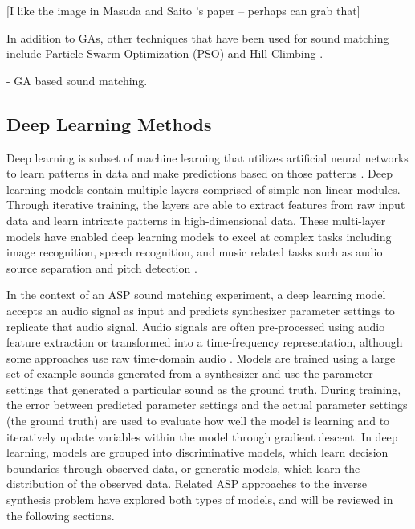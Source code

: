 [I like the image in Masuda and Saito 's paper -- perhaps can grab that]

In addition to GAs, other techniques that have been used for sound matching include Particle Swarm Optimization (PSO) \cite{heise2009automatic} and Hill-Climbing \cite{roth2011comparison, luke2019stochastic}.

\cite{masudo2021quality} - GA based sound matching.

\subsection{Deep Learning Methods}
Deep learning is subset of machine learning that utilizes artificial neural networks to learn patterns in data and make predictions based on those patterns \cite{lecun2015deep}. Deep learning models contain multiple layers comprised of simple non-linear modules. Through iterative training, the layers are able to extract features from raw input data and learn intricate patterns in high-dimensional data. These multi-layer models have enabled deep learning models to excel at complex tasks including image recognition, speech recognition, and music related tasks such as audio source separation \cite{spleeter2019} and pitch detection \cite{kim2018crepe}.

In the context of an ASP sound matching experiment, a deep learning model accepts an audio signal as input and predicts synthesizer parameter settings to replicate that audio signal. Audio signals are often pre-processed using audio feature extraction or transformed into a time-frequency representation, although some approaches use raw time-domain audio \cite{barkan2019inversynth}. Models are trained using a large set of example sounds generated from a synthesizer and use the parameter settings that generated a particular sound as the ground truth. During training, the error between predicted parameter settings and the actual parameter settings (the ground truth) are used to evaluate how well the model is learning and to iteratively update variables within the model through gradient descent. In deep learning, models are grouped into discriminative models, which learn decision boundaries through observed data, or generatic models, which learn the distribution of the observed data. Related ASP approaches to the inverse synthesis problem have explored both types of models, and will be reviewed in the following sections.

